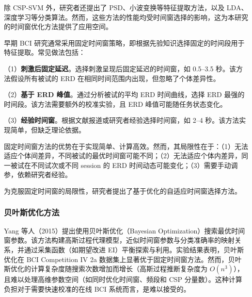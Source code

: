 除 CSP-SVM 外，研究者还提出了 PSD、小波变换等特征提取方法，以及 LDA、深度学习等分类算法\cite{lotte2007review}。然而，这些方法的性能均受时间窗选择的影响，这为本研究的时间窗优化方法提供了应用空间。

\label{sec:time_window_optimization}

\label{subsec:fixed_window}

早期 BCI 研究通常采用固定时间窗策略，即根据先验知识选择固定的时间段用于特征提取\cite{lotte2007review}。常见做法包括：

（1）\textbf{刺激后固定延迟}。选择刺激呈现后固定延迟的时间窗，如 0.5--3.5 秒\cite{tangermann2012review}。该方法假设所有被试的 ERD 在相同时间范围内出现，但忽略了个体差异性。

（2）\textbf{基于 ERD 峰值}。通过分析被试的平均 ERD 时间曲线，选择 ERD 最强的时间段\cite{pfurtscheller1999event}。该方法需要额外的校准实验，且 ERD 峰值可能随任务状态变化。

（3）\textbf{经验时间窗}。根据文献报道或研究者经验选择时间窗，如 2--4 秒\cite{lotte2007review}。该方法实现简单，但缺乏理论依据。

固定时间窗方法的优势在于实现简单、计算高效。然而，其局限性在于：（1）无法适应个体间差异，不同被试的最优时间窗可能不同；（2）无法适应个体内差异，同一被试在不同试次或不同 session 的 ERD 时间动态可能变化；（3）需要手动调参，依赖研究者经验\cite{lotte2011regularizing}。

\label{subsec:optimization_based}

为克服固定时间窗的局限性，研究者提出了基于优化的自适应时间窗选择方法。

\subsubsection{贝叶斯优化方法}

Yang 等人（2015）提出使用贝叶斯优化（Bayesian Optimization）搜索最优时间窗参数\cite{yang2015time}。该方法构建高斯过程代理模型，近似时间窗参数与分类准确率的映射关系，并通过采集函数（如期望改进 EI）平衡探索与利用。实验结果表明，贝叶斯优化在 BCI Competition IV 2a 数据集上显著优于固定时间窗方法\cite{yang2015time}。然而，贝叶斯优化的计算复杂度随搜索次数增加而增长（高斯过程推断复杂度为 $O(n^3)$），且难以处理高维参数空间（如同时优化时间窗、频段和 CSP 分量数）。这种计算负担对于需要快速校准的在线 BCI 系统而言，是难以接受的。

